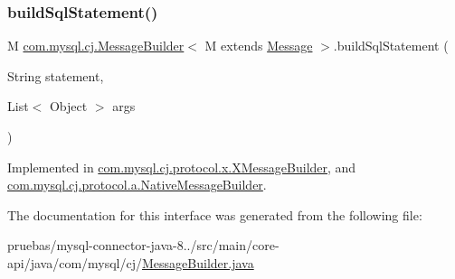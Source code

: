 \subsubsection{\texorpdfstring{build\+Sql\+Statement()}{buildSqlStatement()}\hspace{0.1cm}{\footnotesize\ttfamily [2/2]}}
{\footnotesize\ttfamily M \mbox{\hyperlink{interfacecom_1_1mysql_1_1cj_1_1_message_builder}{com.\+mysql.\+cj.\+Message\+Builder}}$<$ M extends \mbox{\hyperlink{interfacecom_1_1mysql_1_1cj_1_1protocol_1_1_message}{Message}} $>$.build\+Sql\+Statement (\begin{DoxyParamCaption}\item[{String}]{statement,  }\item[{List$<$ Object $>$}]{args }\end{DoxyParamCaption})}



Implemented in \mbox{\hyperlink{classcom_1_1mysql_1_1cj_1_1protocol_1_1x_1_1_x_message_builder_a2c3993eeb6a20211b7a81f15784fb537}{com.\+mysql.\+cj.\+protocol.\+x.\+X\+Message\+Builder}}, and \mbox{\hyperlink{classcom_1_1mysql_1_1cj_1_1protocol_1_1a_1_1_native_message_builder_a14aff33bdb019a2620a4dc8939fef409}{com.\+mysql.\+cj.\+protocol.\+a.\+Native\+Message\+Builder}}.



The documentation for this interface was generated from the following file\+:\begin{DoxyCompactItemize}
\item 
pruebas/mysql-\/connector-\/java-\/8../src/main/core-\/api/java/com/mysql/cj/\mbox{\hyperlink{_message_builder_8java}{Message\+Builder.\+java}}\end{DoxyCompactItemize}

